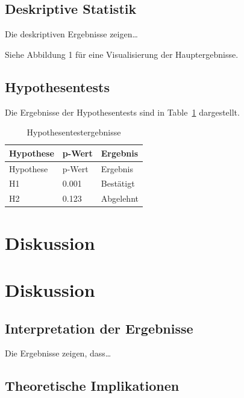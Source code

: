 \documentclass[12pt, a4paper, twoside, openright]{report}
\begin{document}
\section{Deskriptive Statistik}\label{deskriptive-statistik}

Die deskriptiven Ergebnisse zeigen\ldots{}

Siehe Abbildung 1 für eine Visualisierung der Hauptergebnisse.

\section{Hypothesentests}\label{hypothesentests}

Die Ergebnisse der Hypothesentests sind in Table~\ref{tbl-results}
dargestellt.

\begin{longtable}[]{@{}lll@{}}
\caption{Hypothesentestergebnisse}\label{tbl-results}\tabularnewline
\toprule\noalign{}
Hypothese & p-Wert & Ergebnis \\
\midrule\noalign{}
\endfirsthead
\toprule\noalign{}
Hypothese & p-Wert & Ergebnis \\
\midrule\noalign{}
\endhead
\bottomrule\noalign{}
\endlastfoot
H1 & 0.001 & Bestätigt \\
H2 & 0.123 & Abgelehnt \\
\end{longtable}


\chapter{Diskussion}\label{diskussion}


\chapter{Diskussion}\label{diskussion-1}

\section{Interpretation der
Ergebnisse}\label{interpretation-der-ergebnisse}

Die Ergebnisse zeigen, dass\ldots{}

\section{Theoretische Implikationen}\label{theoretische-implikationen}
\end{document}
